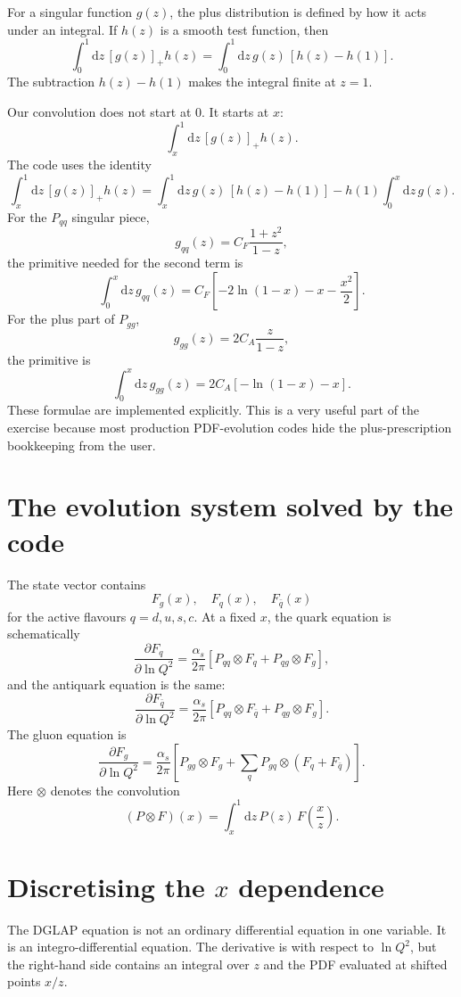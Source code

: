 \documentclass[11pt]{article}
\newcommand{\dd}{\mathrm{d}}
\newcommand{\as}{\alpha_s}
\begin{document}
For a singular function \(g(z)\), the plus distribution is defined by how it
acts under an integral.  If \(h(z)\) is a smooth test function, then
\[
  \int_0^1 \dd z\, [g(z)]_+ h(z)
  =
  \int_0^1 \dd z\, g(z)\,[h(z)-h(1)].
\]
The subtraction \(h(z)-h(1)\) makes the integral finite at \(z=1\).

Our convolution does not start at \(0\).  It starts at \(x\):
\[
  \int_x^1 \dd z\, [g(z)]_+ h(z).
\]
The code uses the identity
\[
  \int_x^1 \dd z\, [g(z)]_+ h(z)
  =
  \int_x^1 \dd z\, g(z)\,[h(z)-h(1)]
  -
  h(1)\int_0^x \dd z\, g(z).
\]
For the \(P_{qq}\) singular piece,
\[
  g_{qq}(z)=C_F\frac{1+z^2}{1-z},
\]
the primitive needed for the second term is
\[
  \int_0^x \dd z\, g_{qq}(z)
  =
  C_F
  \left[
    -2\ln(1-x)-x-\frac{x^2}{2}
    \right].
\]
For the plus part of \(P_{gg}\),
\[
  g_{gg}(z)=2C_A\frac{z}{1-z},
\]
the primitive is
\[
  \int_0^x \dd z\, g_{gg}(z)
  =
  2C_A[-\ln(1-x)-x].
\]
These formulae are implemented explicitly.  This is a very useful part of the
exercise because most production PDF-evolution codes hide the plus-prescription
bookkeeping from the user.

\section{The evolution system solved by the code}

The state vector contains
\[
  F_g(x),\quad
  F_q(x),\quad
  F_{\bar q}(x)
\]
for the active flavours \(q=d,u,s,c\).  At a fixed \(x\), the quark equation is
schematically
\[
  \frac{\partial F_q}{\partial\ln Q^2}
  =
  \frac{\as}{2\pi}
  \left[
    P_{qq}\otimes F_q
    +
    P_{qg}\otimes F_g
    \right],
\]
and the antiquark equation is the same:
\[
  \frac{\partial F_{\bar q}}{\partial\ln Q^2}
  =
  \frac{\as}{2\pi}
  \left[
    P_{qq}\otimes F_{\bar q}
    +
    P_{qg}\otimes F_g
    \right].
\]
The gluon equation is
\[
  \frac{\partial F_g}{\partial\ln Q^2}
  =
  \frac{\as}{2\pi}
  \left[
    P_{gg}\otimes F_g
    +
    \sum_q P_{gq}\otimes(F_q+F_{\bar q})
    \right].
\]
Here \(\otimes\) denotes the convolution
\[
  (P\otimes F)(x)
  =
  \int_x^1 \dd z\,P(z)\,F\left(\frac{x}{z}\right).
\]

\section{Discretising the \(x\) dependence}

The DGLAP equation is not an ordinary differential equation in one variable.
It is an integro-differential equation.  The derivative is with respect to
\(\ln Q^2\), but the right-hand side contains an integral over \(z\) and the
PDF evaluated at shifted points \(x/z\).
\end{document}
